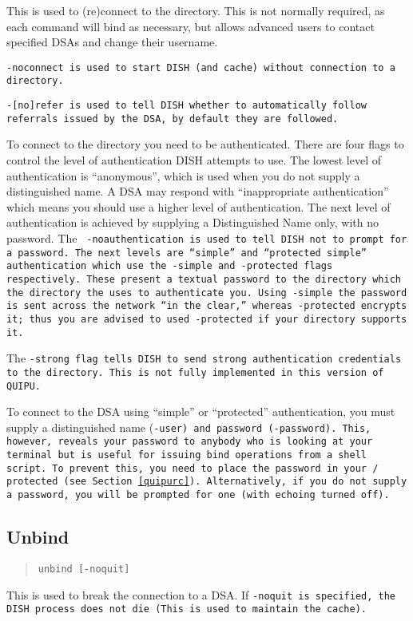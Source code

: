 This is used to (re)connect to the directory.  This is not normally
required, as each command will bind as necessary, but allows advanced users
to contact specified DSAs and change their username.

\tt -noconnect\rm \ is used to start DISH (and cache) without connection to a
directory.

\tt -[no]refer\rm \ is used to tell DISH whether to automatically follow
referrals issued by the DSA, by default they are followed.

To connect to the directory you need to be authenticated.
There are four flags to control the level of authentication DISH
attempts to use.
The lowest level of authentication is ``anonymous'', which is used
when you do not supply a distinguished name.  A DSA may respond with
``inappropriate authentication'' which means you should use a higher
level of authentication.
The next level of authentication is achieved by supplying a 
Distinguished Name only, with no password.  The \tt
-noauthentication\rm \ is used to tell DISH not to prompt for a password.
The next levels are ``simple'' and ``protected simple'' authentication which
use the \tt -simple\rm \ and \tt -protected\rm \ flags respectively.
These present a textual password to the
directory which the directory the uses to authenticate you.
Using \tt -simple\rm \ the password is sent across the network ``in the
clear,'' whereas \tt -protected\rm \ encrypts it; thus you are advised to
used \tt -protected\rm \ if your directory supports it.

The \tt -strong\rm \ flag tells DISH to send strong authentication
credentials to the directory. This is not fully implemented in this version
of QUIPU.

To connect to the DSA using ``simple'' or ``protected'' authentication, 
you must supply a
distinguished name (\tt -user\rm ) and password (\tt -password\rm ).
This, however, reveals your password to anybody who is looking at your 
terminal but is useful for issuing bind operations from
a shell script. To prevent this, you need to place the 
password in your \unix/ protected  (see Section~\ref{quipurc}).
Alternatively, if you do not supply a password, you will be prompted
for one (with echoing turned off).


\subsection {Unbind}

\begin{quote}\begin{verbatim}
unbind [-noquit]
\end{verbatim}\end{quote}
This is used to break the connection to a DSA.
If \tt -noquit\rm \ is specified, the DISH process does not die (This is used to
maintain the cache).

